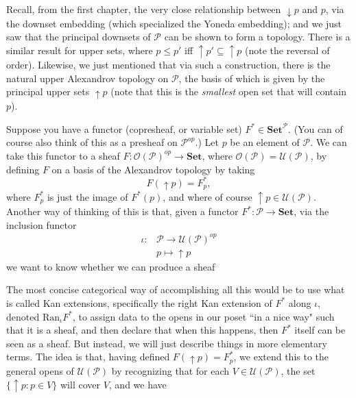 \documentclass[11pt]{book}
\theoremstyle{definition}
\theoremstyle{definition}
\theoremstyle{definition}
\theoremstyle{theorem}
\theoremstyle{definition}
\begin{document}
Recall, from the first chapter, the very close relationship between $\downarrow p$ and $p$, via the downset embedding (which specialized the Yoneda embedding); and we just saw that the principal downsets of $\mathcal{P}$ can be shown to form a topology. There is a similar result for upper sets, where $p \leq p'$ iff $\uparrow p' \subseteq  \uparrow p$ (note the reversal of order). Likewise, we just mentioned that via such a construction, there is the natural upper Alexandrov topology on $\mathcal{P}$, the basis of which is given by the principal upper sets $\uparrow p$ (note that this is the \textit{smallest} open set that will contain $p$).\par  
Suppose you have a functor (copresheaf, or variable set) $F^* \in \textbf{Set}^{\mathcal{P}}$. (You can of course also think of this as a presheaf on $\mathcal{P}^{op}$.) Let $p$ be an element of $\mathcal{P}$. We can take this functor to a sheaf $F: \mathscr{O}(\mathcal{P})^{op} \rightarrow \textbf{Set}$, where $\mathscr{O}(\mathcal{P}) = \mathcal{U}(\mathcal{P})$, by defining $F$ on a basis of the Alexandrov topology by taking 
\begin{equation*}
F(\uparrow p) = F^*_p,
\end{equation*}
where $F^*_p$ is just the image of $F^*(p)$, and where of course $\uparrow p \in \mathcal{U}(\mathcal{P})$. Another way of thinking of this is that, given a functor $F^*: \mathcal{P} \rightarrow \textbf{Set}$, via the inclusion functor 
\begin{align*}
\iota: & \mathcal{P} \rightarrow \mathcal{U}(\mathcal{P})^{op} \\ 
&  p \mapsto \uparrow p
\end{align*} 
we want to know whether we can produce a sheaf 
\begin{center} 
\end{center} 
The most concise categorical way of accomplishing all this would be to use what is called Kan extensions, specifically the right Kan extension of $F^*$ along $\iota$, denoted $\text{Ran}_{\iota} F^*$, to assign data to the opens in our poset ``in a nice way" such that it is a sheaf, and then declare that when this happens, then $F^*$ itself can be seen as a sheaf. But instead, we will just describe things in more elementary terms. The idea is that, having defined $F(\uparrow p) = F^*_p$, we extend this to the general opens of $\mathcal{U}(\mathcal{P})$ by recognizing that for each $V \in \mathcal{U}(\mathcal{P})$, the set $\{\uparrow p: p \in V\}$ will cover $V$, and we have 
\end{document}
